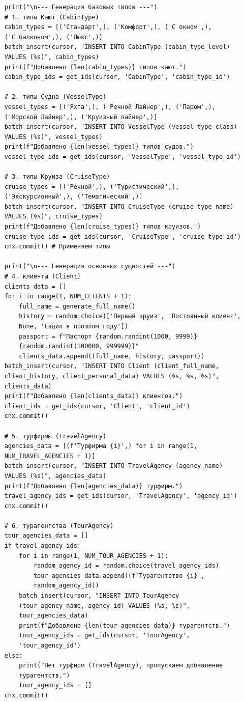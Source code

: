 \documentclass[11pt,a4paper,final]{article}
\begin{document}
{\begin{verbatim}
    print("\n--- Генерация базовых типов ---")
    # 1. типы Кают (CabinType)
    cabin_types = [('Стандарт',), ('Комфорт',), ('С окном',), 
    ('С балконом',), ('Люкс',)]
    batch_insert(cursor, "INSERT INTO CabinType (cabin_type_level) 
    VALUES (%s)", cabin_types)
    print(f"Добавлено {len(cabin_types)} типов кают.")
    cabin_type_ids = get_ids(cursor, 'CabinType', 'cabin_type_id')

    # 2. типы Судна (VesselType)
    vessel_types = [('Яхта',), ('Речной Лайнер',), ('Паром',), 
    ('Морской Лайнер',), ('Круизный лайнер',)]
    batch_insert(cursor, "INSERT INTO VesselType (vessel_type_class)
    VALUES (%s)", vessel_types)
    print(f"Добавлено {len(vessel_types)} типов судов.")
    vessel_type_ids = get_ids(cursor, 'VesselType', 'vessel_type_id')

    # 3. типы Круиза (CruiseType)
    cruise_types = [('Речной',), ('Туристический',),
    ('Экскурсионный',), ('Тематический',)]
    batch_insert(cursor, "INSERT INTO CruiseType (cruise_type_name)
    VALUES (%s)", cruise_types)
    print(f"Добавлено {len(cruise_types)} типов круизов.")
    cruise_type_ids = get_ids(cursor, 'CruiseType', 'cruise_type_id')
    cnx.commit() # Применяем типы

    print("\n--- Генерация основных сущностей ---")
    # 4. клиенты (Client)
    clients_data = []
    for i in range(1, NUM_CLIENTS + 1):
        full_name = generate_full_name()
        history = random.choice(['Первый круиз', 'Постоянный клиент',
        None, 'Ездил в прошлом году'])
        passport = f"Паспорт {random.randint(1000, 9999)}
        {random.randint(100000, 999999)}"
        clients_data.append((full_name, history, passport))
    batch_insert(cursor, "INSERT INTO Client (client_full_name,
    client_history, client_personal_data) VALUES (%s, %s, %s)",
    clients_data)
    print(f"Добавлено {len(clients_data)} клиентов.")
    client_ids = get_ids(cursor, 'Client', 'client_id')
    cnx.commit()

    # 5. турфирмы (TravelAgency)
    agencies_data = [(f'Турфирма {i}',) for i in range(1,
    NUM_TRAVEL_AGENCIES + 1)]
    batch_insert(cursor, "INSERT INTO TravelAgency (agency_name)
    VALUES (%s)", agencies_data)
    print(f"Добавлено {len(agencies_data)} турфирм.")
    travel_agency_ids = get_ids(cursor, 'TravelAgency', 'agency_id')
    cnx.commit()

    # 6. турагентства (TourAgency)
    tour_agencies_data = []
    if travel_agency_ids:
        for i in range(1, NUM_TOUR_AGENCIES + 1):
            random_agency_id = random.choice(travel_agency_ids)
            tour_agencies_data.append((f'Турагентство {i}',
            random_agency_id))
        batch_insert(cursor, "INSERT INTO TourAgency
        (tour_agency_name, agency_id) VALUES (%s, %s)", 
        tour_agencies_data)
        print(f"Добавлено {len(tour_agencies_data)} турагентств.")
        tour_agency_ids = get_ids(cursor, 'TourAgency',
        'tour_agency_id')
    else:
        print("Нет турфирм (TravelAgency), пропускаем добавление
        турагентств.")
        tour_agency_ids = []
    cnx.commit()


\end{verbatim}}
\end{document}
